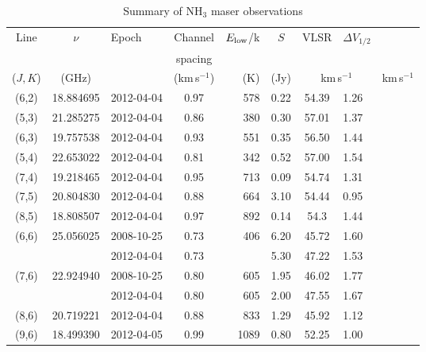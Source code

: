 \documentclass[oldversion]{aa}
\begin{document}
\begin{table*}
\label{tab1}
\caption[]{Summary of NH$_3$ maser observations}
\begin{flushleft}
\begin{tabular}{cclcrccl}
\hline
Line      &  $\nu$    &  Epoch        & Channel        & $E_{\rm low}$/k & $S$   & VLSR  & $\Delta V_{1/2}$ \\
          &           &               & spacing        &                 &       &                &                  \\
($J,K$)   &  (GHz)    &               & (km\,s$^{-1}$) &    (K)          & (Jy)  & \multicolumn{2}{c}{km\,s$^{-1}$} & \multicolumn{2}{c}{km\,s$^{-1}$}\\
\hline 
  (6,2)   & 18.884695 & 2012-04-04    &  0.97          &   578           & 0.22  & 54.39 & 1.26             \\
  (5,3)   & 21.285275 & 2012-04-04 &  0.86          &   380           & 0.30  & 57.01 & 1.37             \\
  (6,3)   & 19.757538 & 2012-04-04 &  0.93          &   551           & 0.35  & 56.50 & 1.44             \\
  (5,4)   & 22.653022 & 2012-04-04 &  0.81          &   342           & 0.52  & 57.00 & 1.54             \\
  (7,4)   & 19.218465 & 2012-04-04 &  0.95          &   713           & 0.09  & 54.74 & 1.31             \\
  (7,5)   & 20.804830 & 2012-04-04 &  0.88          &   664           & 3.10  & 54.44 & 0.95             \\
  (8,5)   & 18.808507 & 2012-04-04 &  0.97          &   892           & 0.14  & 54.3 & 1.44             \\
  (6,6)   & 25.056025 & 2008-10-25 &  0.73          &   406           & 6.20  & 45.72 & 1.60             \\
          &           & 2012-04-04 &  0.73          &                 & 5.30  & 47.22 & 1.53             \\
  (7,6)   & 22.924940 & 2008-10-25 &  0.80          &   605           & 1.95  & 46.02 & 1.77             \\
          &           & 2012-04-04 &  0.80          &   605           & 2.00  & 47.55 & 1.67             \\
  (8,6)   & 20.719221 & 2012-04-04 &  0.88          &   833           & 1.29  & 45.92 & 1.12             \\
  (9,6)   & 18.499390 & 2012-04-05  &  0.99          &  1089           & 0.80  & 52.25 & 1.00             \\

\end{tabular}
\end{flushleft}
\end{table*}
\end{document}
